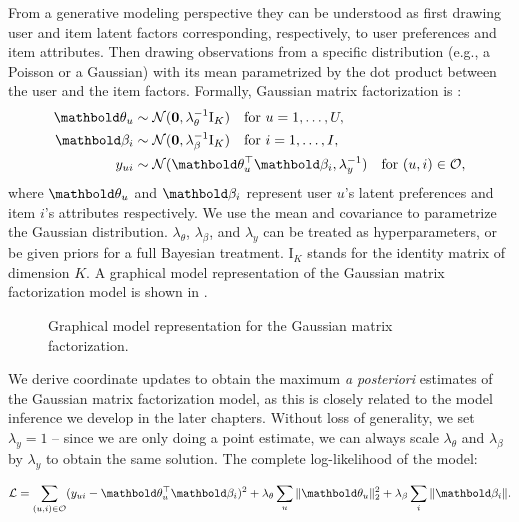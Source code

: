From a generative modeling perspective they
can be understood as first drawing user and item latent factors corresponding,
respectively, to user preferences and item attributes. Then drawing 
observations from a specific distribution (e.g., a Poisson
or a Gaussian) with its mean parametrized by the dot product between the user and
the item factors. Formally, Gaussian matrix factorization is \citep{mnih2007probabilistic}: 
\begin{equation} 
\begin{split}
	\mb\theta_{u} &\sim \mathcal{N}(\bzero, \lambda_\theta^{-1} \mathrm{I}_K) \quad \textrm{for } u = 1, \dots, U, \\
	\mb\beta_{i} &\sim \mathcal{N}(\bzero, \lambda_\beta^{-1} \mathrm{I}_K) \quad \textrm{for } i = 1, \dots, I, \\
	y_{ui} &\sim \mathcal{N}(\mb\theta_u^\top \mb\beta_i, \lambda_y^{-1}) \quad \textrm{for } (u, i) \in \cO, 
 \end{split}
 \label{chpt:background:eq:gmf}
 \end{equation}
where $\mb\theta_u$ and $\mb\beta_i$ represent user $u$'s latent preferences and item $i$'s attributes respectively. We use the mean and covariance to
parametrize the Gaussian distribution. $\lambda_\theta$, $\lambda_\beta$, and
$\lambda_y$ can be treated as hyperparameters, or be given priors for a full Bayesian treatment. $\mathrm{I}_K$ stands for the identity
matrix of dimension $K$. A graphical model representation of the Gaussian matrix factorization model is shown in .

\begin{figure}[ht]
  \centering
     
  \caption{Graphical model representation for the Gaussian matrix factorization.}
\label{chpt:background:fig:gmf}
\end{figure}

We derive coordinate updates to obtain the maximum \textit{a posteriori} estimates of the Gaussian matrix factorization model, as this is closely related to the model inference we develop in the later chapters. Without loss of generality, we set $\lambda_y = 1$ -- since we are only doing a point estimate, we can always scale $\lambda_\theta$ and $\lambda_\beta$ by $\lambda_y$ to obtain the same solution. The complete log-likelihood of the model:

\begin{equation*}
\cL = \sum_{(u, i)\in \cO} (y_{ui} - \mb\theta_u^\top\mb\beta_i)^2 + \lambda_\theta \sum_u \|\mb\theta_u \|^2_2 + \lambda_\beta \sum_i \|\mb\beta_i \|.
\end{equation*}

